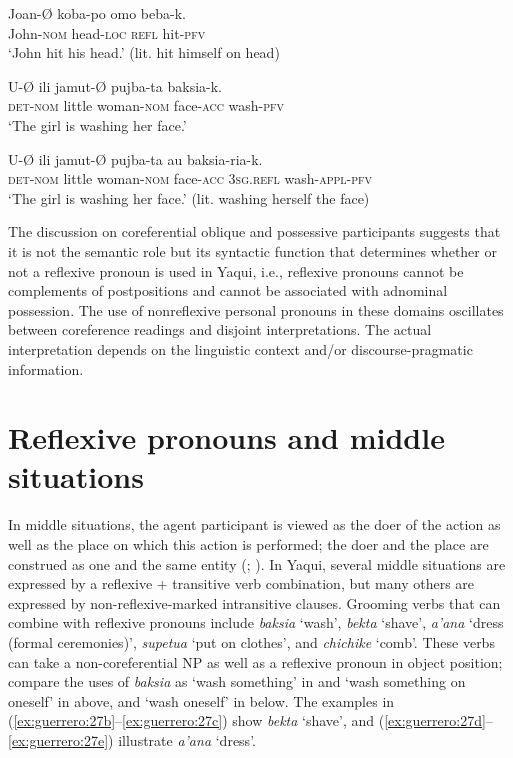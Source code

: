 \documentclass[output=paper]{langscibook}
\begin{document}
\ea%
    \label{ex:guerrero:26}
\ea
\label{ex:guerrero:26a}
\gll Joan-Ø    koba-po    omo  beba-k.\\
John-\textsc{nom}  head-\textsc{loc}  \textsc{refl}  hit-\textsc{pfv}\\
\glt ‘John hit his head.’ (lit. hit himself on head)

\ex
\label{ex:guerrero:26b}
\gll U-Ø  ili   jamut-Ø  pujba-ta     baksia-k.\\
  \textsc{det-nom}    little  woman-\textsc{nom}  face-\textsc{acc}  wash-\textsc{pfv}\\
\glt ‘The girl is washing her face.’

\ex
\label{ex:guerrero:26c}
\gll U-Ø  ili   jamut-Ø  pujba-ta   au  baksia-ria-k.\\
  \textsc{det-nom}    little  woman-\textsc{nom}  face-\textsc{acc}  \textsc{3sg.refl}  wash-\textsc{appl-pfv}\\
\glt ‘The girl is washing her face.’ (lit. washing herself the face)
\z
\z


The discussion on coreferential oblique and possessive participants suggests that it is not the semantic role but its syntactic function that determines whether or not a reflexive pronoun is used in Yaqui, i.e., reflexive pronouns cannot be complements of postpositions and cannot be associated with adnominal possession. The use of nonreflexive personal pronouns in these domains oscillates between coreference readings and disjoint interpretations. The actual interpretation depends on the linguistic context and/or discourse-pragmatic information.



\section{Reflexive pronouns and middle situations}\label{sec:guerrero:4}



In middle situations, the agent participant is viewed as the doer of the action as well as the place on which this action is performed; the doer and the place are construed as one and the same entity (\citealt{Kemmer1993}; \citealt{Creissels2006}). In Yaqui, several middle situations are expressed by a reflexive + transitive verb combination, but many others are expressed by non-reflexive-marked intransitive clauses. Grooming verbs that can combine with reflexive pronouns include \textit{baksia} ‘wash’, \textit{bekta} ‘shave’, \textit{a’ana} ‘dress (formal ceremonies)’, \textit{supetua} ‘put on clothes’, and \textit{chichike} ‘comb’. These verbs can take a non-coreferential NP as well as a reflexive pronoun in object position; compare the uses of \textit{baksia} as ‘wash something’ in  and ‘wash something on oneself’ in  above, and ‘wash oneself’ in  below. The examples in (\ref{ex:guerrero:27b}--\ref{ex:guerrero:27c}) show \textit{bekta} ‘shave’, and (\ref{ex:guerrero:27d}--\ref{ex:guerrero:27e}) illustrate \textit{a’ana} ‘dress’.
\end{document}
